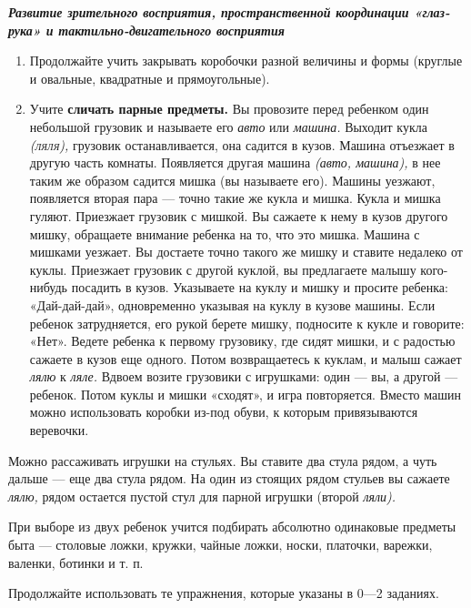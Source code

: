 \documentclass[a5paper]{book}
\renewcommand{\emph}[1]{\textit{#1}}
\begin{document}
\emph{\textbf{Развитие зрительного восприятия, пространственной
координации «глаз-рука» и тактильно-двигательного восприятия}}


\begin{enumerate}
\def\labelenumi{\arabic{enumi}.}
\item
  
  Продолжайте учить закрывать коробочки разной величины и формы (круглые
  и овальные, квадратные и прямоугольные).
  
\item
  
  Учите \textbf{сличать парные предметы.} Вы провозите перед ребенком
  один небольшой грузовик и называете его \emph{авто} или \emph{машина.}
  Выходит кукла \emph{\textsc{(ляля),}} грузовик останавливается, она
  садится в кузов. Машина отъезжает в другую часть комнаты. Появляется
  другая машина \emph{(авто, машина),} в нее таким же образом садится
  мишка (вы называете его). Машины уезжают, появляется вторая пара ---
  точно такие же кукла и мишка. Кукла и мишка гуляют. Приезжает грузовик
  с мишкой. Вы сажаете к нему в кузов другого мишку, обращаете внимание
  ребенка на то, что это мишка. Машина с мишками уезжает. Вы достаете
  точно такого же мишку и ставите недалеко от куклы. Приезжает грузовик
  с другой куклой, вы предлагаете малышу кого-нибудь посадить в кузов.
  Указываете на куклу и мишку и просите ребенка: «Дай-дай-дай»,
  одновременно указывая на куклу в кузове машины. Если ребенок
  затрудняется, его рукой берете мишку, подносите к кукле и говорите:
  «Нет». Ведете ребенка к первому грузовику, где сидят мишки, и с
  радостью сажаете в кузов еще одного. Потом возвращаетесь к куклам, и
  малыш сажает \emph{лялю} к \emph{ляле.} Вдвоем возите грузовики с
  игрушками: один --- вы, а другой --- ребенок. Потом куклы и мишки
  «сходят», и игра повторяется. Вместо машин можно использовать коробки
  из-под обуви, к которым привязываются веревочки.
  
\end{enumerate}


Можно рассаживать игрушки на стульях. Вы ставите два стула рядом, а чуть
дальше --- еще два стула рядом. На один из стоящих рядом стульев вы
сажаете \emph{лялю,} рядом остается пустой стул для парной игрушки
(второй \emph{ляли).}

При выборе из двух ребенок учится подбирать абсолютно одинаковые
предметы быта --- столовые ложки, кружки, чайные ложки, носки, платочки,
варежки, валенки, ботинки и т. п.

Продолжайте использовать те упражнения, которые указаны в 0---2
заданиях.
\end{document}
